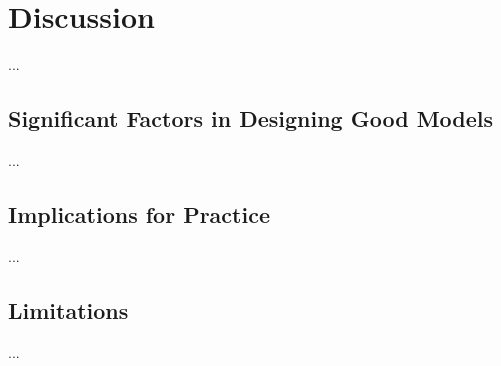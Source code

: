 \chapter{Discussion}
...

\section{Significant Factors in Designing Good Models}
...

\section{Implications for Practice}
...

\section{Limitations}
...
